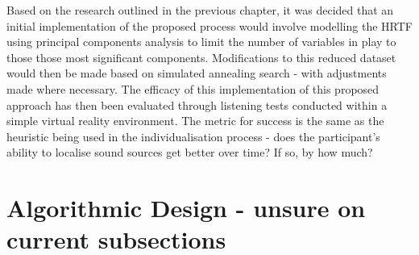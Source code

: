 Based on the research outlined in the previous chapter, it was decided that an initial implementation of the proposed process would involve modelling the HRTF using principal components analysis to limit the number of variables in play to those those most significant components. Modifications to this reduced dataset would then be made based on simulated annealing search - with adjustments made where necessary. The efficacy of this implementation of this proposed approach has then been evaluated through listening tests conducted within a simple virtual reality environment. The metric for success is the same as the heuristic being used in the individualisation process - does the participant's ability to localise sound sources get better over time? If so, by how much?

\section{Algorithmic Design - unsure on current subsections}
